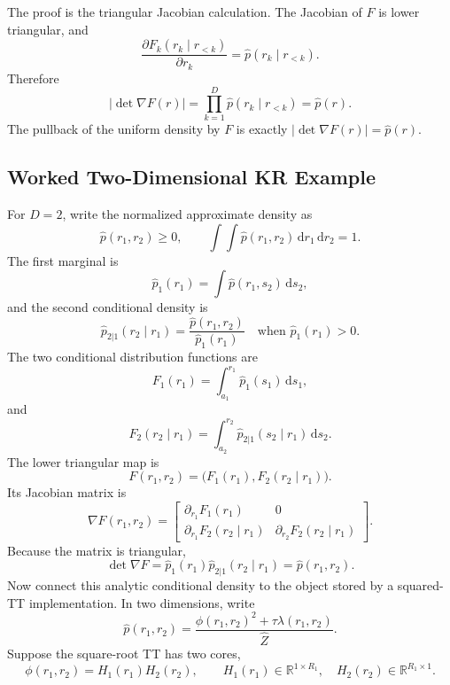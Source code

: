 \documentclass[11pt]{article}
\newcommand{\R}{\mathbb R}
\newcommand{\dd}{\,\mathrm d}
\begin{document}
The proof is the triangular Jacobian calculation.  The Jacobian of \(F\) is
lower triangular, and
\[
    \frac{\partial F_k(r_k\mid r_{<k})}{\partial r_k}
    =
    \widehat p(r_k\mid r_{<k}).
\]
Therefore
\[
    |\det\nabla F(r)|
    =
    \prod_{k=1}^D \widehat p(r_k\mid r_{<k})
    =
    \widehat p(r).
    \label{eq:p24-k5}
\]
The pullback of the uniform density by \(F\) is exactly
\(|\det\nabla F(r)|=\widehat p(r)\).

\subsection*{Worked Two-Dimensional KR Example}

For \(D=2\), write the normalized approximate density as
\[
    \widehat p(r_1,r_2)\ge0,
    \qquad
    \int\!\!\int \widehat p(r_1,r_2)\dd r_1\dd r_2=1.
    \label{eq:p24-p23-kr2-1}
\]
The first marginal is
\[
    \widehat p_1(r_1)
    =
    \int \widehat p(r_1,s_2)\dd s_2,
    \label{eq:p24-p23-kr2-2}
\]
and the second conditional density is
\[
    \widehat p_{2|1}(r_2\mid r_1)
    =
    \frac{\widehat p(r_1,r_2)}{\widehat p_1(r_1)}
    \quad\text{when }\widehat p_1(r_1)>0.
    \label{eq:p24-p23-kr2-3}
\]
The two conditional distribution functions are
\[
    F_1(r_1)
    =
    \int_{a_1}^{r_1}\widehat p_1(s_1)\dd s_1,
    \label{eq:p24-p23-kr2-4}
\]
and
\[
    F_2(r_2\mid r_1)
    =
    \int_{a_2}^{r_2}
    \widehat p_{2|1}(s_2\mid r_1)\dd s_2.
    \label{eq:p24-p23-kr2-5}
\]
The lower triangular map is
\[
    F(r_1,r_2)=
    \bigl(F_1(r_1),F_2(r_2\mid r_1)\bigr).
    \label{eq:p24-p23-kr2-6}
\]
Its Jacobian matrix is
\[
    \nabla F(r_1,r_2)
    =
    \begin{bmatrix}
    \partial_{r_1}F_1(r_1) & 0\\
    \partial_{r_1}F_2(r_2\mid r_1) &
    \partial_{r_2}F_2(r_2\mid r_1)
    \end{bmatrix}.
    \label{eq:p24-p23-kr2-7}
\]
Because the matrix is triangular,
\[
    \det\nabla F
    =
    \widehat p_1(r_1)\widehat p_{2|1}(r_2\mid r_1)
    =
    \widehat p(r_1,r_2).
    \label{eq:p24-p23-kr2-8}
\]
Now connect this analytic conditional density to the object stored by a
squared-TT implementation.  In two dimensions, write
\[
    \widehat p(r_1,r_2)
    =
    \frac{\phi(r_1,r_2)^2+\tau\lambda(r_1,r_2)}
    {\widehat Z}.
    \label{eq:p24-p23-kr2-8a}
\]
Suppose the square-root TT has two cores,
\[
    \phi(r_1,r_2)
    =
    H_1(r_1)H_2(r_2),
    \qquad
    H_1(r_1)\in\R^{1\times R_1},\quad
    H_2(r_2)\in\R^{R_1\times1}.
    \label{eq:p24-p23-kr2-8b}
\]
\end{document}
